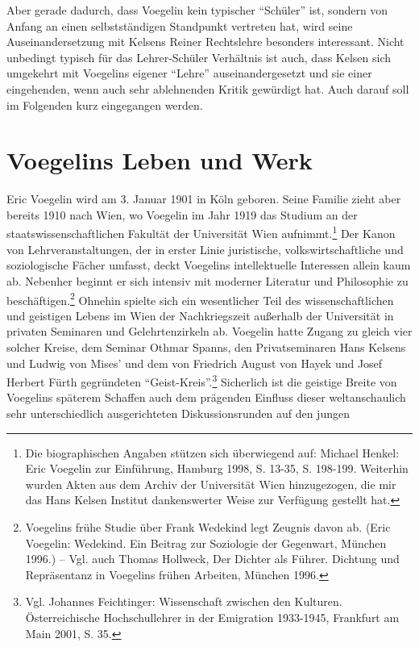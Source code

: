 \documentclass[12pt,a4paper,ngerman]{article}
\begin{document}
Aber gerade dadurch, dass Voegelin kein typischer "`Schüler"' ist, sondern von
Anfang an einen selbstständigen Standpunkt vertreten hat, wird seine
Auseinandersetzung mit Kelsens Reiner Rechtslehre besonders interessant.
Nicht unbedingt typisch für das Lehrer-Schüler Verhältnis ist auch, dass
Kelsen sich umgekehrt mit Voegelins eigener "`Lehre"' auseinandergesetzt und
sie einer eingehenden, wenn auch sehr ablehnenden Kritik gewürdigt hat. Auch
darauf soll im Folgenden kurz eingegangen werden.

\section{Voegelins Leben und Werk}

Eric Voegelin wird am 3. Januar 1901 in Köln geboren. Seine Familie zieht aber
bereits 1910 nach Wien, wo Voegelin im Jahr 1919 das Studium an der
staatswissenschaftlichen Fakultät der Universität Wien aufnimmt.\footnote{Die
  biographischen Angaben stützen sich überwiegend auf: Michael Henkel: Eric
  Voegelin zur Einführung, Hamburg 1998, S.  13-35, S. 198-199. Weiterhin
  wurden Akten aus dem Archiv der Universität Wien hinzugezogen, die mir das
  Hans Kelsen Institut dankenswerter Weise zur Verfügung gestellt hat.} Der
Kanon von Lehrveranstaltungen, der in erster Linie juristische,
volkswirtschaftliche und soziologische Fächer umfasst, deckt Voegelins
intellektuelle Interessen allein kaum ab.  Nebenher beginnt er sich intensiv
mit moderner Literatur und Philosophie zu beschäftigen.\footnote{Voegelins
  frühe Studie über Frank Wedekind legt Zeugnis davon ab. (Eric Voegelin:
  Wedekind. Ein Beitrag zur Soziologie der Gegenwart, München 1996.) -- Vgl.
  auch Thomas Hollweck, Der Dichter als Führer. Dichtung und Repräsentanz in
  Voegelins frühen Arbeiten, München 1996.} Ohnehin spielte sich ein
wesentlicher Teil des wissenschaftlichen und geistigen Lebens im Wien der
Nachkriegszeit außerhalb der Universität in privaten Seminaren und
Gelehrtenzirkeln ab. Voegelin hatte Zugang zu gleich vier solcher Kreise, dem
Seminar Othmar Spanns, den Privatseminaren Hans Kelsens und Ludwig von Mises'
und dem von Friedrich August von Hayek und Josef Herbert Fürth gegründeten
``Geist-Kreis''.\footnote{Vgl. Johannes Feichtinger: Wissenschaft zwischen den
  Kulturen.  Österreichische Hochschullehrer in der Emigration 1933-1945,
  Frankfurt am Main 2001, S. 35.} Sicherlich ist die geistige Breite von
Voegelins späterem Schaffen auch dem prägenden Einfluss dieser weltanschaulich
sehr unterschiedlich ausgerichteten Diskussionsrunden auf den jungen
\end{document}
